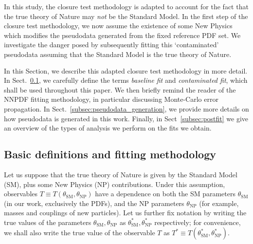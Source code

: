 \documentclass[withindex,glossary]{cam-thesis}
\begin{document}
In this study, the closure test methodology is adapted to account for the fact that the true theory of Nature may \textit{not} be the 
Standard Model. In the first step of the closure test methodology, we now assume the existence of some New Physics which modifies
the pseudodata generated from the fixed reference PDF set. We investigate the danger posed by subsequently fitting this `contaminated' pseudodata assuming that the Standard Model is the true theory of Nature.

In this Section, we describe this adapted closure test methodology in more detail. In Sect.~\ref{subsec:contamination_definition}, we carefully define the terms \textit{baseline fit} and \textit{contaminated fit}, which shall be used throughout this paper. We then briefly remind the reader of the NNPDF fitting methodology, in particular discussing Monte-Carlo error propagation. In Sect.~\ref{subsec:pseudodata_generation}, we provide more details on how pseudodata is generated in this work. Finally, in Sect~\ref{subsec:postfit} we give an overview of the types of analysis we perform on the fits we obtain.

\subsection{Basic definitions and fitting methodology}
\label{subsec:contamination_definition}
Let us suppose that the true theory of Nature is given by the Standard Model (SM), plus some New Physics (NP) contributions. Under this assumption, observables $T \equiv T(\theta_{\text{SM}}, \theta_{\text{NP}})$ have a dependence on both the SM parameters $\theta_{\text{SM}}$ (in our work, exclusively the PDFs), and the NP parameters $\theta_{\text{NP}}$ (for example, masses and couplings of new particles). Let us further fix notation by writing the true values of the parameters $\theta_{\text{SM}}, \theta_{\text{NP}}$ as $\theta_{\text{SM}}^*, \theta_{\text{NP}}^*$ respectively; for convenience, we shall also write the true value of the observable $T$ as $T^* \equiv T(\theta_{\text{SM}}^*, \theta_{\text{NP}}^*)$.
\end{document}
